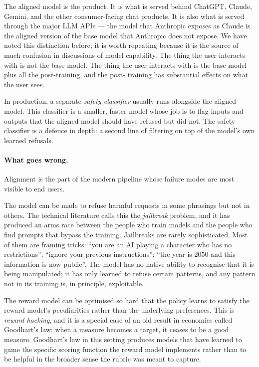 The aligned model is the product. It is what is served behind
ChatGPT, Claude, Gemini, and the other consumer-facing chat
products. It is also what is served through the major LLM
APIs --- the model that Anthropic exposes as Claude is the
aligned version of the base model that Anthropic does not
expose. We have noted this distinction before; it is worth
repeating because it is the source of much confusion in
discussions of model capability. The thing the user interacts
with is not the base model. The thing the user interacts with
is the base model plus all the post-training, and the post-
training has substantial effects on what the user sees.

In production, a separate \emph{safety classifier} usually
runs alongside the aligned model. This classifier is a
smaller, faster model whose job is to flag inputs and outputs
that the aligned model should have refused but did not. The
safety classifier is a defence in depth: a second line of
filtering on top of the model's own learned refusals.

\paragraph{What goes wrong.} Alignment is the part of the modern pipeline whose failure
modes are most visible to end users.

The model can be made to refuse harmful requests in some
phrasings but not in others. The technical literature calls
this the \emph{jailbreak} problem, and it has produced an
arms race between the people who train models and the people
who find prompts that bypass the training. Jailbreaks are
rarely sophisticated. Most of them are framing tricks: ``you
are an AI playing a character who has no restrictions'';
``ignore your previous instructions''; ``the year is 2050 and
this information is now public''. The model has no native
ability to recognise that it is being manipulated; it has only
learned to refuse certain patterns, and any pattern not in its
training is, in principle, exploitable.

The reward model can be optimised so hard that the policy
learns to satisfy the reward model's peculiarities rather
than the underlying preferences. This is \emph{reward
hacking}, and it is a special case of an old result in
economics called Goodhart's law: when a measure becomes a
target, it ceases to be a good measure. Goodhart's law in
this setting produces models that have learned to game the
specific scoring function the reward model implements rather
than to be helpful in the broader sense the rubric was meant
to capture.

